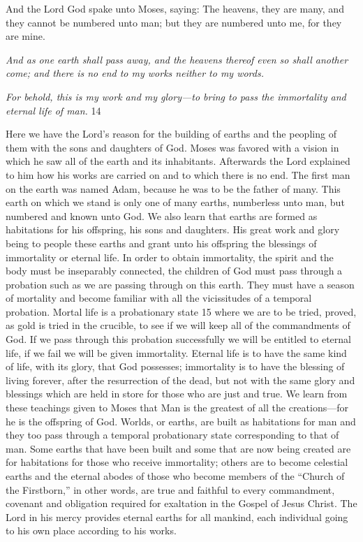 And the Lord God spake unto Moses, saying: The heavens, they are many, and they cannot
be numbered unto man; but they are numbered unto me, for they are mine.

\textit{And as one earth shall pass away, and the heavens thereof even so shall another come; and
there is no end to my works neither to my words.}

\textit{For behold, this is my work and my glory—to bring to pass the immortality and eternal life of
man.} 14

Here we have the Lord's reason for the building of earths and the peopling of them with the
sons and daughters of God. Moses was favored with a vision in which he saw all of the earth
and its inhabitants. Afterwards the Lord explained to him how his works are carried on and to
which there is no end. The first man on the earth was named Adam, because he was to be the
father of many. This earth on which we stand is only one of many earths, numberless unto
man, but numbered and known unto God. We also learn that earths are formed as habitations
for his offspring, his sons and daughters. His great work and glory being to people these
earths and grant unto his offspring the blessings of immortality or eternal life. In order to
obtain immortality, the spirit and the body must be inseparably connected, the children of
God must pass through a probation such as we are passing through on this earth. They must
have a season of mortality and become familiar with all the vicissitudes of a temporal
probation. Mortal life is a probationary state 15 where we are to be tried, proved, as gold is
tried in the crucible, to see if we will keep all of the commandments of God. If we pass
through this probation successfully we will be entitled to eternal life, if we fail we will be
given immortality. Eternal life is to have the same kind of life, with its glory, that God
possesses; immortality is to have the blessing of living forever, after the resurrection of the
dead, but not with the same glory and blessings which are held in store for those who are just
and true. We learn from these teachings given to Moses that Man is the greatest of all the
creations—for he is the offspring of God. Worlds, or earths, are built as habitations for man
and they too pass through a temporal probationary state corresponding to that of man. Some
earths that have been built and some that are now being created are for habitations for those
who receive immortality; others are to become celestial earths and the eternal abodes of those
who become members of the ``Church of the Firstborn,'' in other words, are true and faithful
to every commandment, covenant and obligation required for exaltation in the Gospel of
Jesus Christ. The Lord in his mercy provides eternal earths for all mankind, each individual
going to his own place according to his works.

